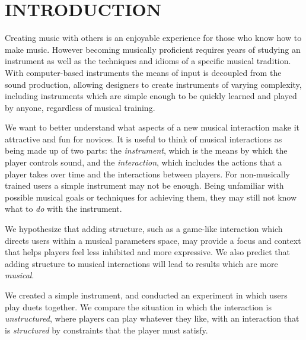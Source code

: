 \documentclass{article}
\begin{document}







\section{INTRODUCTION}
Creating music with others is an enjoyable experience for those who know how to make music. However becoming musically proficient requires years of studying an instrument as well as the techniques and idioms of a specific musical tradition. With computer-based instruments the means of input is decoupled from the sound production, allowing designers to create instruments of varying complexity, including instruments which are simple enough to be quickly learned and played by anyone, regardless of musical training.

We want to better understand what aspects of a new musical interaction make it attractive and fun for novices.  It is useful to think of musical interactions as being made up of two parts:  the \textit{instrument}, which is the means by which the player controls sound, and the \textit{interaction}, which includes the actions that a player takes over time and the interactions between players.  For non-musically trained users a simple instrument may not be enough. Being unfamiliar with possible musical goals or techniques for achieving them, they may still not know what to \textit{do} with the instrument.

We hypothesize that adding structure, such as a game-like interaction which directs users within a musical parameters space, may provide a focus and context that helps players feel less inhibited and more expressive.   We also predict that adding structure to musical interactions will lead to results which are more \textit{musical}.

We created a simple instrument, and conducted an experiment in which users play duets together.  We compare the situation in which the interaction is \textit{unstructured}, where players can play whatever they like, with an interaction that is \textit{structured} by constraints that the player must satisfy.
\end{document}
